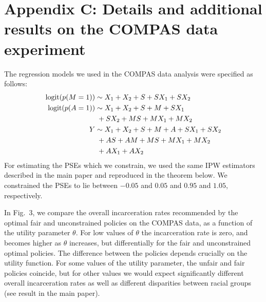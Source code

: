 \documentclass[letterpaper]{article} %
\begin{document}
\section*{Appendix C: Details and additional results on the COMPAS data experiment}
The regression models we used in the COMPAS data analysis were specified as follows:
{\small
\begin{align*}
\text{logit}(p(M=1)) &\sim X_1 + X_2 + S + SX_1 + SX_2\\
\text{logit}(p(A=1)) &\sim X_1 + X_2 + S + M + SX_1\\
  & \hspace{0.1cm} + SX_2 + MS + MX_1 + MX_2\\
Y &\sim X_1 + X_2 + S + M + A + SX_1 + SX_2 \\
 & \hspace{0.1cm} + AS + AM + MS + MX_1 + MX_2\\ 
 & \hspace{0.1cm} + AX_1 + AX_2 
\end{align*} 
}%
For estimating the PSEs which we constrain, we used the same IPW estimators described in the main paper and reproduced in the theorem below. We constrained the PSEs to lie between $-0.05$ and $0.05$ and $0.95$ and $1.05$, respectively.

In Fig.\ 3, we compare the overall incarceration rates recommended by the optimal fair and unconstrained policies on the COMPAS data, as a function of the utility parameter $\theta$. For low values of $\theta$ the incarceration rate is zero, and becomes higher as $\theta$ increases, but differentially for the fair and unconstrained optimal policies. The difference between the policies depends crucially on the utility function. For some values of the utility parameter, the unfair and fair policies coincide, but for other values we would expect significantly different overall incarceration rates as well as different disparities between racial groups (see result in the main paper).
\end{document}
